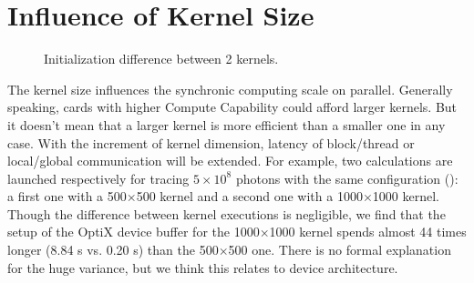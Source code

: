 \section{Influence of Kernel Size}
\begin{figure}
\centering
{}
\caption{Initialization difference between 2 kernels.}
\label{fig:kernel}
\end{figure}
The kernel size influences the synchronic computing scale on parallel. Generally speaking, cards with higher Compute Capability could afford larger kernels. But it doesn't mean that a larger kernel is more efficient than a smaller one in any case. With the increment of kernel dimension, latency of block/thread or local/global communication will be extended. For example, two calculations are launched respectively for tracing $5\times10^8$ photons with the same configuration (): a first one with a 500$\times$500 kernel and a second one with a 1000$\times$1000 kernel. Though the difference between kernel executions is negligible, we find that the setup of the OptiX device buffer for the 1000$\times$1000 kernel spends almost 44 times longer (8.84 s vs. 0.20 s) than the 500$\times$500 one. There is no formal explanation for the huge variance, but we think this relates to device architecture.
